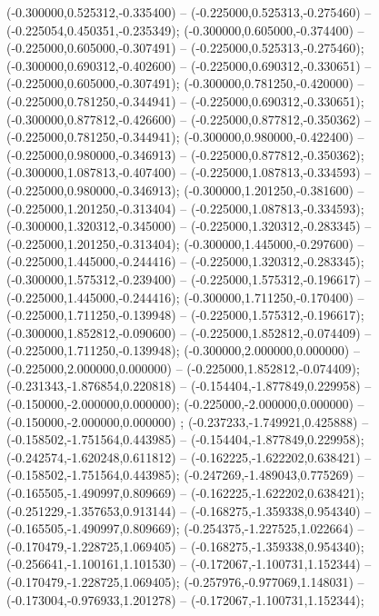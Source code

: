  (-0.300000,0.525312,-0.335400) -- (-0.225000,0.525313,-0.275460) -- (-0.225054,0.450351,-0.235349);
 (-0.300000,0.605000,-0.374400) -- (-0.225000,0.605000,-0.307491) -- (-0.225000,0.525313,-0.275460);
 (-0.300000,0.690312,-0.402600) -- (-0.225000,0.690312,-0.330651) -- (-0.225000,0.605000,-0.307491);
 (-0.300000,0.781250,-0.420000) -- (-0.225000,0.781250,-0.344941) -- (-0.225000,0.690312,-0.330651);
 (-0.300000,0.877812,-0.426600) -- (-0.225000,0.877812,-0.350362) -- (-0.225000,0.781250,-0.344941);
 (-0.300000,0.980000,-0.422400) -- (-0.225000,0.980000,-0.346913) -- (-0.225000,0.877812,-0.350362);
 (-0.300000,1.087813,-0.407400) -- (-0.225000,1.087813,-0.334593) -- (-0.225000,0.980000,-0.346913);
 (-0.300000,1.201250,-0.381600) -- (-0.225000,1.201250,-0.313404) -- (-0.225000,1.087813,-0.334593);
 (-0.300000,1.320312,-0.345000) -- (-0.225000,1.320312,-0.283345) -- (-0.225000,1.201250,-0.313404);
 (-0.300000,1.445000,-0.297600) -- (-0.225000,1.445000,-0.244416) -- (-0.225000,1.320312,-0.283345);
 (-0.300000,1.575312,-0.239400) -- (-0.225000,1.575312,-0.196617) -- (-0.225000,1.445000,-0.244416);
 (-0.300000,1.711250,-0.170400) -- (-0.225000,1.711250,-0.139948) -- (-0.225000,1.575312,-0.196617);
 (-0.300000,1.852812,-0.090600) -- (-0.225000,1.852812,-0.074409) -- (-0.225000,1.711250,-0.139948);
 (-0.300000,2.000000,0.000000) -- (-0.225000,2.000000,0.000000) -- (-0.225000,1.852812,-0.074409);
 (-0.231343,-1.876854,0.220818) -- (-0.154404,-1.877849,0.229958) -- (-0.150000,-2.000000,0.000000);
 (-0.225000,-2.000000,0.000000) -- (-0.150000,-2.000000,0.000000) ;
 (-0.237233,-1.749921,0.425888) -- (-0.158502,-1.751564,0.443985) -- (-0.154404,-1.877849,0.229958);
 (-0.242574,-1.620248,0.611812) -- (-0.162225,-1.622202,0.638421) -- (-0.158502,-1.751564,0.443985);
 (-0.247269,-1.489043,0.775269) -- (-0.165505,-1.490997,0.809669) -- (-0.162225,-1.622202,0.638421);
 (-0.251229,-1.357653,0.913144) -- (-0.168275,-1.359338,0.954340) -- (-0.165505,-1.490997,0.809669);
 (-0.254375,-1.227525,1.022664) -- (-0.170479,-1.228725,1.069405) -- (-0.168275,-1.359338,0.954340);
 (-0.256641,-1.100161,1.101530) -- (-0.172067,-1.100731,1.152344) -- (-0.170479,-1.228725,1.069405);
 (-0.257976,-0.977069,1.148031) -- (-0.173004,-0.976933,1.201278) -- (-0.172067,-1.100731,1.152344);
